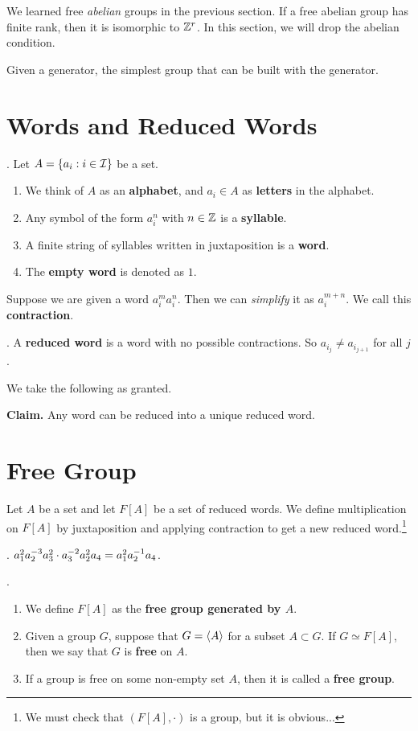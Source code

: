 
We learned free \textit{abelian} groups in the previous section. If a free abelian group has finite rank, then it is isomorphic to \(\mathbb{Z}^r\). In this section, we will drop the abelian condition.

Given a generator, the simplest group that can be built with the generator.

\section*{Words and Reduced Words}

. Let \(A = \{a_i : i \in \mathcal{I}\}\) be a set.
\begin{enumerate}
    \item We think of \(A\) as an \textbf{alphabet}, and \(a_i \in A\) as \textbf{letters} in the alphabet.
    \item Any symbol of the form \(a_i^n\) with \(n \in \mathbb{Z}\) is a \textbf{syllable}.
    \item A finite string of syllables written in juxtaposition is a \textbf{word}.
    \item The \textbf{empty word} is denoted as \(1\).
\end{enumerate}

Suppose we are given a word \(a_i^m a_i^n\). Then we can \textit{simplify} it as \(a_{i}^{m+n}\). We call this \textbf{contraction}.

. A \textbf{reduced word} is a word with no possible contractions. So \(a_{i_j} \neq a_{i_{j+1}}\) for all \(j\).

\smallskip

We take the following as granted.

\textbf{Claim.} Any word can be reduced into a unique reduced word.

\section*{Free Group}

Let \(A\) be a set and let \(F[A]\) be a set of reduced words. We define multiplication on \(F[A]\) by juxtaposition and applying contraction to get a new reduced word.\footnote{We must check that \((F[A], \cdot)\) is a group, but it is obvious...}

\ex. \(a_1^2 a_2^{-3} a_3^2 \cdot a_3^{-2} a_2^2 a_4 = a_1^2 a_2^{-1} a_4\).

. 
\begin{enumerate}
    \item We define \(F[A]\) as the \textbf{free group generated by \(A\)}.
    \item Given a group \(G\), suppose that \(G = \left\langle A \right\rangle\) for a subset \(A \subset G\). If \(G \simeq F[A]\), then we say that \(G\) is \textbf{free} on \(A\).
    \item If a group is free on some non-empty set \(A\), then it is called a \textbf{free group}.
\end{enumerate}

